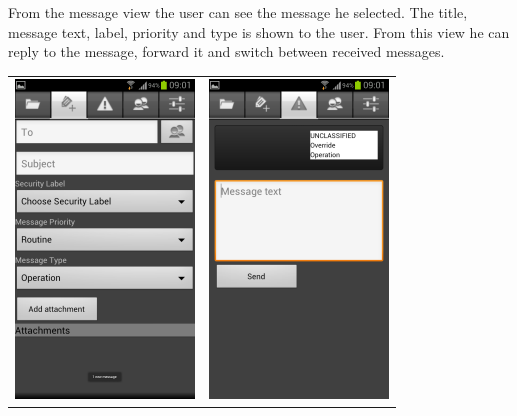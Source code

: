 From the message view the user can see the message he selected. The title, message text, label, priority and type is shown to the user. From this view he can reply to the message, forward it and switch between received messages.
\newline
\begin{tabular}{cc}
\includegraphics{sendmessage} & \includegraphics{instamessage}
\end{tabular}

